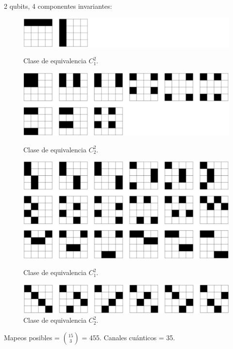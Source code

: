 \documentclass[11pt]{beamer}
\begin{document}
\begin{frame}{2 qubits, 4 componentes invariantes:}

\begin{figure}[H]
\centering
  \begin{minipage}{0.48\textwidth}
  	\centering
  	\vspace{30pt}
    \includegraphics[width=\textwidth]{img-congreso/C14.pdf}
    \caption{Clase de equivalencia $C_1^2$.}
  \end{minipage}\hfill
  \begin{minipage}{0.48\textwidth}
  	\centering
    \includegraphics[width=\textwidth]{img-congreso/C24.pdf}
    \caption{Clase de equivalencia $C_2^2$.}
  \end{minipage}\vfill
  
  \begin{minipage}{0.48\textwidth}
  	\centering
    \includegraphics[width=\textwidth]{img-congreso/C34.pdf}
    \caption{Clase de equivalencia $C_1^2$.}
  \end{minipage}\hfill
  \begin{minipage}{0.48\textwidth}
  	\centering
  	\vspace{50pt}
    \includegraphics[width=\textwidth]{img-congreso/C44.pdf}
    \caption{Clase de equivalencia $C_2^2$.}
  \end{minipage}
\end{figure}\vfill
Mapeos posibles = $15 \choose 3$ = 455. Canales cuánticos = 35.

\end{frame}
\end{document}
